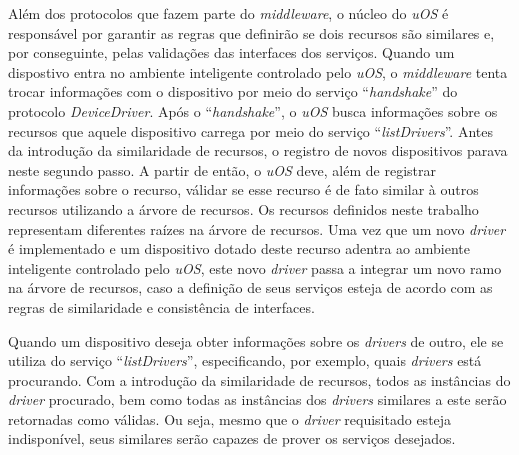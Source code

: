 Além dos protocolos que fazem parte do \emph{middleware}, o núcleo do \emph{uOS} é responsável por garantir as regras que definirão se dois recursos são similares e, por conseguinte, pelas validações das interfaces dos serviços. Quando um dispostivo entra no ambiente inteligente controlado pelo \emph{uOS}, o \emph{middleware} tenta trocar informações com o dispositivo por meio do serviço ``\emph{handshake}'' do protocolo \emph{DeviceDriver}. Após o ``\emph{handshake}'', o \emph{uOS} busca informações sobre os recursos que aquele dispositivo carrega por meio do serviço ``\emph{listDrivers}''. Antes da introdução da similaridade de recursos, o registro de novos dispositivos parava neste segundo passo. A partir de então, o \emph{uOS} deve, além de registrar informações sobre o recurso, válidar se esse recurso é de fato similar à outros recursos utilizando a árvore de recursos. Os recursos definidos neste trabalho representam diferentes raízes na árvore de recursos. Uma vez que um novo \emph{driver} é implementado e um dispositivo dotado deste recurso adentra ao ambiente inteligente controlado pelo \emph{uOS}, este novo \emph{driver} passa a integrar um novo ramo na árvore de recursos, caso a definição de seus serviços esteja de acordo com as regras de similaridade e consistência de interfaces.

Quando um dispositivo deseja obter informações sobre os \emph{drivers} de outro, ele se utiliza do serviço ``\emph{listDrivers}'', especificando, por exemplo, quais \emph{drivers} está procurando. Com a introdução da similaridade de recursos, todos as instâncias do \emph{driver} procurado, bem como todas as instâncias dos \emph{drivers} similares a este serão retornadas como válidas. Ou seja, mesmo que o \emph{driver} requisitado esteja indisponível, seus similares serão capazes de prover os serviços desejados.
